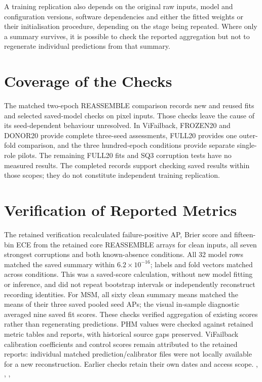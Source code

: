 A training replication also depends on the original raw inputs, model and configuration
versions, software dependencies and either the fitted weights or their initialisation
procedure, depending on the stage being repeated. Where only a summary survives, it is
possible to check the reported aggregation but not to regenerate individual predictions
from that summary.

\section{Coverage of the Checks}
The matched two-epoch REASSEMBLE comparison records new and reused fits and selected
saved-model checks on pixel inputs. Those checks leave the cause of its seed-dependent
behaviour unresolved. In ViFailback, FROZEN20 and DONOR20 provide complete three-seed
assessments, FULL20 provides one outer-fold comparison, and the three hundred-epoch
conditions provide separate single-role pilots. The remaining FULL20 fits and SQ3
corruption tests have no measured results. The completed records support checking saved
results within those scopes; they do not constitute independent training replication.

\section{Verification of Reported Metrics}
The retained verification recalculated failure-positive AP, Brier score and fifteen-bin
ECE from the retained core REASSEMBLE arrays for clean inputs, all seven strongest
corruptions and both known-absence conditions. All 32 model rows matched the saved
summary within $6.2\times10^{-16}$; labels and fold vectors matched across conditions.
This was a saved-score calculation, without new model fitting or inference, and did not
repeat bootstrap intervals or independently reconstruct recording identities.
For MSM, all sixty clean summary means matched the means of their three saved pooled
seed APs; the visual in-sample diagnostic averaged nine saved fit scores.
These checks verified aggregation of existing scores rather than regenerating predictions.
PHM values were checked against retained metric tables and reports, with historical
source gaps preserved. ViFailback calibration coefficients and control scores remain
attributed to the retained reports: individual matched prediction/calibrator files were
not locally available for a new reconstruction. Earlier checks
retain their own dates and access scope.
{, , , }

